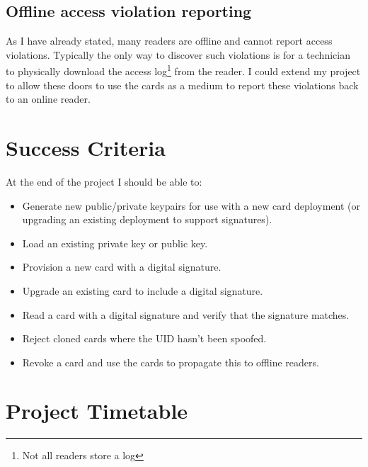 \documentclass[a4paper, 12pt]{article}
\begin{document}


  \subsection*{Offline access violation reporting}

  As I have already stated, many readers are offline and cannot report access
  violations. Typically the only way to discover such violations is for a
  technician to physically download the access log\footnote{Not all readers
  store a log} from the reader. I could extend my project to allow these doors
  to use the cards as a medium to report these violations back to an online
  reader.


  \section*{Success Criteria}

  At the end of the project I should be able to:
  \begin{itemize}
    \item Generate new public/private keypairs for use with a new card
      deployment (or upgrading an existing deployment to support signatures).
    \item Load an existing private key or public key.
    \item Provision a new card with a digital signature.
    \item Upgrade an existing card to include a digital signature.
    \item Read a card with a digital signature and verify that the signature
      matches.
    \item Reject cloned cards where the UID hasn't been spoofed.
    \item Revoke a card and use the cards to propagate this to offline readers.
  \end{itemize}

  \section*{Project Timetable}
\end{document}
